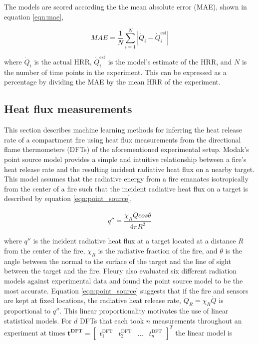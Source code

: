 \documentclass{article}
\begin{document}
The models are scored according the the mean absolute error (MAE), shown in equation \ref{eqn:mae},

\begin{equation}
  \label{eqn:mae}
  MAE = \frac{1}{N} \sum_{i=1}^N{|\dot{Q}_i - \dot{Q}^{\text{est}}_i|}
\end{equation}

\noindent where $\dot{Q}_i$ is the actual HRR, $\dot{Q}^{\text{est}}_i$ is the model's estimate of the HRR, and $N$ is the number of time points in the experiment. This can be expressed as a percentage by dividing the MAE by the mean HRR of the experiment. 

\subsection{Heat flux measurements}
This section describes machine learning methods for inferring the heat release rate of a compartment fire using heat flux measurements from the directional flame thermometers (DFTs) of the aforementioned experimental setup. Modak's point source model \cite{modak1977thermal} provides a simple and intuitive relationship between a fire's heat release rate and the resulting incident radiative heat flux on a nearby target. This model assumes that the radiative energy from a fire emanates isotropically from the center of a fire such that the incident radiative heat flux on a target is described by equation \ref{eqn:point_source},

 \begin{equation}
  \label{eqn:point_source}
  q'' = \frac{\chi_R\dot{Q}cos\theta}{4\pi R^2}
\end{equation}

where $q''$ is the incident radiative heat flux at a target located at a distance $R$ from the center of the fire, $\chi_R$ is the radiative fraction of the fire, and $\theta$ is the angle between the normal to the surface of the target and the line of sight between the target and the fire. Fleury \cite{fleury2010evaluation} also evaluated six different radiation models against experimental data and found the point source model to be the most accurate. Equation \ref{eqn:point_source} suggests that if the fire and sensors are kept at fixed locations, the radiative heat release rate, $\dot{Q}_R = \chi_R\dot{Q}$ is proportional to $q''$.  This linear proportionality motivates the use of linear statistical models.  For $d$ DFTs that each took $n$ measurements throughout an experiment at times $\boldsymbol{t^{\text{DFT}}} = \begin{bmatrix}  t^{\text{DFT}}_1 & t^{\text{DFT}}_2 & \ldots & t^{\text{DFT}}_n \end{bmatrix}^T$ the linear model is 
\end{document}
